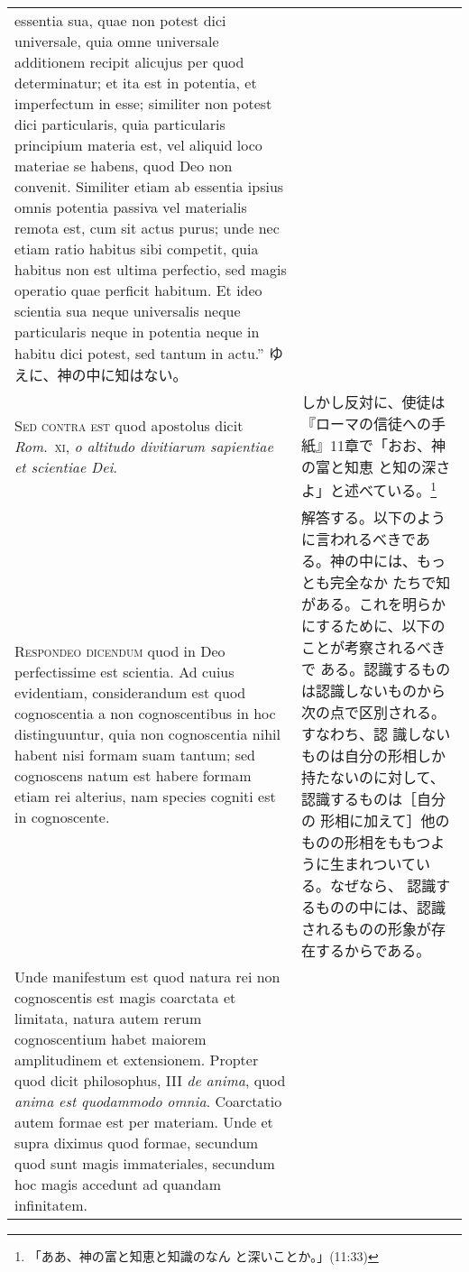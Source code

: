 \documentclass[10pt]{jsarticle} %
\begin{document}
\begin{longtable}{p{21em}p{21em}}
{essentia sua, quae non potest dici universale, quia omne universale
additionem recipit alicujus per quod determinatur; et ita est in
potentia, et imperfectum in esse; similiter non potest dici
particularis, quia particularis principium materia est, vel aliquid
loco materiae se habens, quod Deo non convenit. Similiter etiam ab
essentia ipsius omnis potentia passiva vel materialis remota est, cum
sit actus purus; unde nec etiam ratio habitus sibi competit, quia
habitus non est ultima perfectio, sed magis operatio quae perficit
habitum. Et ideo scientia sua neque universalis neque particularis
neque in potentia neque in habitu dici potest, sed tantum in actu.''
}ゆえに、神の中に知はない。
\\



{\scshape Sed contra est} quod apostolus dicit {\itshape
Rom}.~{\scshape xi}, {\itshape o altitudo divitiarum sapientiae et
scientiae Dei}.

&

しかし反対に、使徒は『ローマの信徒への手紙』11章で「おお、神の富と知恵
と知の深さよ」と述べている。\footnote{「ああ、神の富と知恵と知識のなん
と深いことか。」(11:33)}



\\



{\scshape Respondeo dicendum} quod in Deo perfectissime est
scientia. Ad cuius evidentiam, considerandum est quod cognoscentia a
non cognoscentibus in hoc distinguuntur, quia non cognoscentia nihil
habent nisi formam suam tantum; sed cognoscens natum est habere formam
etiam rei alterius, nam species cogniti est in cognoscente.

&


解答する。以下のように言われるべきである。神の中には、もっとも完全なか
たちで知がある。これを明らかにするために、以下のことが考察されるべきで
ある。認識するものは認識しないものから次の点で区別される。すなわち、認
識しないものは自分の形相しか持たないのに対して、認識するものは［自分の
形相に加えて］他のものの形相をももつように生まれついている。なぜなら、
認識するものの中には、認識されるものの形象が存在するからである。


\\


Unde manifestum est quod natura rei non cognoscentis est magis
coarctata et limitata, natura autem rerum cognoscentium habet maiorem
amplitudinem et extensionem. Propter quod dicit philosophus, III
{\itshape de anima}, quod {\itshape anima est quodammodo
omnia}. Coarctatio autem formae est per materiam. Unde et supra
diximus quod formae, secundum quod sunt magis immateriales, secundum
hoc magis accedunt ad quandam infinitatem.



\end{longtable}
\end{document}
